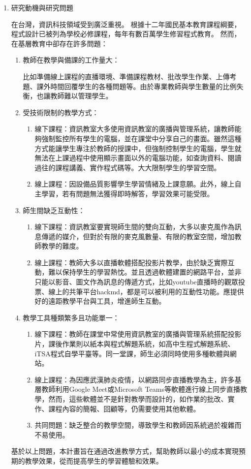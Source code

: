 \documentclass[12pt]{article}
\begin{document}
\begin{enumerate}
  \item 研究動機與研究問題
    \par 在台灣，資訊科技領域受到廣泛重視。
    根據十二年國民基本教育課程綱要\cite{ref2}，
    程式設計已被列為學校必修課程，每年有數百萬學生修習程式教育\cite{ref3}。
    然而，在基層教育中卻存在許多問題：
    \begin{enumerate}
      \setlength{\parindent}{2em}
      \item 教師在教學與備課的工作量大：
        \par 比如準備線上課程的直播環境、準備課程教材、批改學生作業、上傳考題、課外時間回覆學生的各種問題等\cite{ref4}。由於專業教師與學生數量的比例失衡，也讓教師難以管理學生\cite{ref5}。
      \item 受技術限制的教學方式：
        \begin{enumerate}
          \item 線下課程：資訊教室大多使用資訊教室的廣播與管理系統\cite{ref6}，讓教師能夠強制監控所有學生的電腦，並在課堂中分享自己的畫面。雖然這種方式能讓學生專注於教師的授課中，但強制控制學生的電腦，學生就無法在上課過程中使用顯示畫面以外的電腦功能，如查詢資料、閱讀過往的課程講義、實作程式碼等。大大限制學生的學習空間。
          \item 線上課程：因設備品質影響學生學習情緒及上課意願\cite{ref7}。此外，線上自主學習，若有問題無法獲得即時解答，學習效果可能受限\cite{ref4}。
        \end{enumerate}
      \item 師生間缺乏互動性：
        \begin{enumerate}
          \item 線下課程：資訊教室要實現師生間的雙向互動，大多以麥克風作為訊息傳遞的媒介，但對於有限的麥克風數量、有限的教室空間，增加教師教學的難度。
          \item 線上課程：教師大多以直播軟體搭配投影片教學，由於缺乏實際互動，難以保持學生的學習熱忱\cite{ref7}。並且透過軟體建置的網路平台，並非只能以影音、圖文作為訊息的傳遞方式，比如youtube直播時的觀眾投票、線上的共筆平台hackmd，都是可以被利用的互動性功能。應提供好的遠距教學平台與工具，增進師生互動\cite{ref4}。
        \end{enumerate}
      \item 教學工具種類繁多且功能單一：
        \begin{enumerate}
          \item 線下課程：教師在課堂中常使用資訊教室的廣播與管理系統搭配投影片，課後作業則以紙本與程式解題系統，如高中生程式解題系統、iTSA程式自學平臺等。同一堂課，師生必須同時使用多種軟體與網站。
          \item 線上課程：為因應武漢肺炎疫情，以網路同步直播教學為主，許多基層教師利用Google Meet或Microsoft Teams等軟體進行線上同步直播教學，然而，這些軟體並不是針對教學而設計的，如作業的批改、實作、課程內容的簡報、回顧等，仍需要使用其他軟體。
          \item 共同問題：缺乏整合的教學空間，導致學生和教師因系統過於複雜而不易使用。
        \end{enumerate}
    \end{enumerate}
    \par 基於以上問題，本計畫旨在通過改進教學方式，幫助教師以最小的成本實現預期的教學效果，從而提高學生的學習體驗和效果。
    

\end{enumerate}
\end{document}
